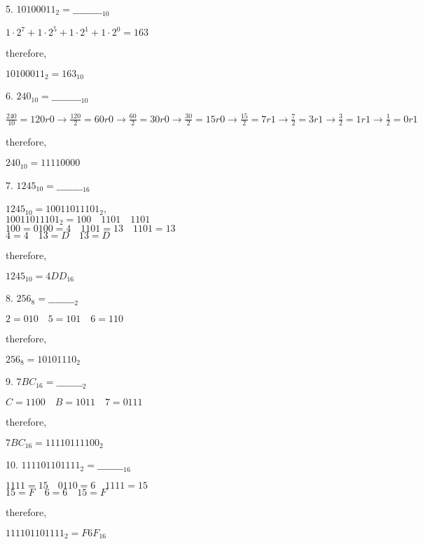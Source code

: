 \documentclass{article}
\begin{document}
    5. $10100011_2=\_\_\_\_\_\_\_\_\__{10}$
    \begin{center}
        $1\cdot2^7+1\cdot2^5+1\cdot2^1+1\cdot2^0=163$
    \end{center}
    therefore,
    \begin{center}
        $10100011_2=163_{10}$
    \end{center}

    6. $240_{10}=\_\_\_\_\_\_\_\_\__{10}$
    \begin{center}
        $\frac{240}{10}=120r0\longrightarrow\frac{120}{2}=60r0\longrightarrow\frac{60}{2}=30r0\longrightarrow\frac{30}{2}=15r0\longrightarrow\frac{15}{2}
        =7r1\longrightarrow\frac{7}{2}=3r1\longrightarrow\frac{3}{2}=1r1\longrightarrow\frac{1}{2}=0r1$
    \end{center}
    therefore,
    \begin{center}
        $240_{10}=11110000$
    \end{center}

    7. $1245_{10}=\_\_\_\_\_\_\_\__{16}$
    \begin{center}
        $1245_{10}=10011011101_2$,\\$10011011101_2=100\quad1101\quad1101$\\$100=0100=4\quad1101=13\quad1101=13$\\$4=4\quad13=D\quad13=D$
    \end{center}
    therefore,
    \begin{center}
        $1245_{10}=4DD_{16}$
    \end{center}

    8. $256_8=\_\_\_\_\_\_\_\__2$
    \begin{center}
        $2=010\quad5=101\quad6=110$
    \end{center}
    therefore,
    \begin{center}
        $256_8=10101110_2$
    \end{center}

    9. $7BC_{16}=\_\_\_\_\_\_\_\__2$
    \begin{center}
        $C=1100 \quad B=1011\quad7=0111$
    \end{center}
    therefore,
    \begin{center}
        $7BC_{16}=11110111100_2$
    \end{center}

    10. $111101101111_2=\_\_\_\_\_\_\_\__{16}$
    \begin{center}
        $1111=15\quad0110=6\quad1111=15$\\$15=F\quad6=6\quad15=F$
    \end{center}
    therefore,
    \begin{center}
        $111101101111_2=F6F_{16}$
    \end{center}
\end{document}
